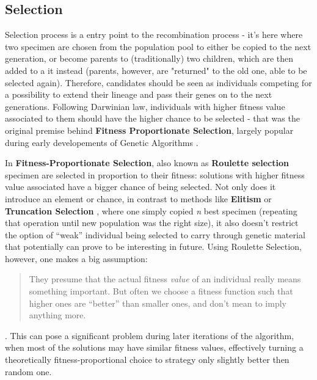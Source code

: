 \subsection{Selection}
Selection process is a entry point to the recombination process - it's here where two specimen are chosen from the population pool to either be copied to the next generation, or become parents to (traditionally) two children, which are then added to a it instead (parents, however, are "returned" to the old one, able to be selected again). Therefore, candidates should be seen as individuals competing for a possibility to extend their lineage and pass their genes on to the next generations. Following Darwinian law, individuals with higher fitness value associated to them should have the higher chance to be selected - that was the original premise behind \textbf{Fitness Proportionate Selection}, largely popular during early developements of Genetic Algorithms \cite{Luke2013Metaheuristics}.

In \textbf{Fitness-Proportionate Selection}, also known as \textbf{Roulette selection} \cite{Luke2013Metaheuristics} specimen are selected in proportion to their fitness: solutions with higher fitness value associated have a bigger chance of being selected. Not only does it introduce an element or chance, in contrast to methods like \textbf{Elitism} or \textbf{Truncation Selection} \cite{Luke2013Metaheuristics}, where one simply copied \textit{n} best specimen (repeating that operation until new population was the right size), it also doesn't restrict the option of ``weak'' individual being selected to carry through genetic material that potentially can prove to be interesting in future. Using Roulette Selection, however, one makes a big assumption:
\begin{quote}
    They presume that the actual fitness \textit{value} of an individual really means something important. But often we choose a fitness function such that higher ones are ``better'' than smaller ones, and don't mean to imply anything more.
\end{quote} \cite{Luke2013Metaheuristics}.
This can pose a significant problem during later iterations of the algorithm, when most of the solutions may have similar fitness values, effectively turning a theoretically fitness-proportional choice to strategy only slightly better then random one.

